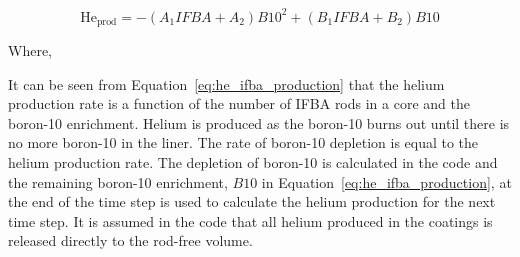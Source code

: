 \begin{equation}
    \label{eq:he_ifba_production}
    \text{He}_{\text{prod}} = - \left( A_{1}IFBA + A_{2} \right){B10}^{2} + \left( B_{1}IFBA + B_{2} \right)B10
\end{equation}

Where,

It can be seen from Equation~\ref{eq:he_ifba_production} that the helium production rate is a
function of the number of IFBA rods in a core and the boron-10 enrichment. Helium is produced as the
boron-10 burns out until there is no more boron-10 in the liner. The rate of boron-10 depletion is
equal to the helium production rate. The depletion of boron-10 is calculated in the code and the
remaining boron-10 enrichment, \(B10\) in Equation~\ref{eq:he_ifba_production}, at the end of the
time step is used to calculate the helium production for the next time step. It is assumed in the
code that all helium produced in the  coatings is released directly to the rod-free
volume.

